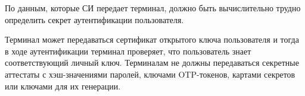 \label{R.AP.Term2}
По данным, которые СИ передает  терминал, 
должно быть вычислительно трудно определить секрет аутентификации пользователя. 
 
\begin{note*}
Терминал может передаваться сертификат открытого ключа пользователя 
и тогда в ходе аутентификации терминал проверяет, что пользователь 
знает соответствующий личный ключ. Терминалам не должны передаваться 
секретные аттестаты с хэш-значениями паролей, ключами OTP-токенов, картами 
секретов или ключами для их генерации.
\end{note*}


%
%
